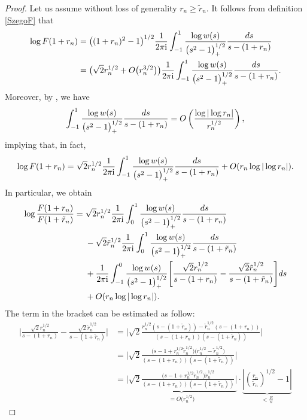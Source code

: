 \documentclass[11pt]{article}
\numberwithin{equation}{section}
\newcommand{\I}{\mathrm{i}}
\numberwithin{equation}{section}
\begin{document}
\begin{proof}
Let us assume without loss of generality $r_n \geq \tilde r_n$. It follows from definition \eqref{SzegoF} that
\begin{align*}
 \log F(1+r_n) &= \big((1+r_n)^2-1\big)^{1/2} \frac{1}{2\pi \I}\int_{-1}^1 \frac{\log w(s)}{\big(s^2-1\big)_+^{1/2}} \frac{{\rm d}s}{s-(1+r_n)}
 \\
 &=\big(\sqrt{2} r_n^{1/2}+O\big(r_n^{3/2}\big)\big) \frac{1}{2\pi \I}\int_{-1}^1 \frac{\log w(s)}{\big(s^2-1\big)_+^{1/2}} \frac{{\rm d}s}{s-(1+r_n)}.
\end{align*}
Moreover, by \cite[equation~A.11]{CD}, we have
\begin{align*}
 \int_{-1}^1 \frac{\log w(s)}{\big(s^2-1\big)_+^{1/2}} \frac{{\rm d}s}{s-(1+r_n)} = O\left(\frac{\log |\log r_n|}{r_n^{1/2}}\right),
\end{align*}
implying that, in fact,
\begin{align*}
 \log F(1+r_n) = \sqrt{2} r_n^{1/2} \frac{1}{2\pi \I}\int_{-1}^1 \frac{\log w(s)}{\big(s^2-1\big)_+^{1/2}} \frac{{\rm d}s}{s-(1+r_n)}+O(r_n \log |\log r_n|).
\end{align*}
In particular, we obtain
\begin{align} \nonumber
 \log \frac{F(1+r_n)}{F(1+\tilde r_n)}={}&
 \sqrt{2} r_n^{1/2} \frac{1}{2\pi \I}\int_{0}^1 \frac{\log w(s)}{\big(s^2-1\big)_+^{1/2}} \frac{{\rm d}s}{s-(1+r_n)}\\
 &-\sqrt{2} \tilde r_n^{1/2} \frac{1}{2\pi \I}\int_{0}^1 \frac{\log w(s)}{\big(s^2-1\big)_+^{1/2}} \frac{{\rm d}s}{s-(1+\tilde r_n)} \nonumber
 \\
 &+\frac{1}{2\pi \I}\int_{-1}^0 \frac{\log w(s)}{\big(s^2-1\big)_+^{1/2}} \Bigg[\frac{\sqrt{2} r_n^{1/2}}{s-(1+r_n)}-\frac{\sqrt{2} \tilde r_n^{1/2}}{s-(1+\tilde r_n)}\Bigg] {\rm d}s \nonumber \\
 &+O(r_n \log |\log r_n|).\label{FF1}
\end{align}
The term in the bracket can be estimated as follow:
\begin{align*}
 \Bigg|\frac{\sqrt{2} r_n^{1/2}}{s-(1+r_n)}-\frac{\sqrt{2} \tilde r_n^{1/2}}{s-(1+\tilde r_n)}\Bigg| &= \Bigg|\sqrt{2} \frac{r_n^{1/2}(s-(1+\tilde r_n))-\tilde r_n^{1/2}(s-(1+ r_n))}{(s-(1+r_n))(s-(1+\tilde r_n))}\Bigg|
 \\
 &= \Bigg|\sqrt{2} \frac{\big(s-1+r_n^{1/2}\tilde r_n^{1/2}\big)\big(r_n^{1/2}-\tilde r_n^{1/2}\big)}{(s-(1+r_n))(s-(1+\tilde r_n))}\Bigg|
 \\
 &= \underbrace{\Bigg|\sqrt{2} \frac{\big(s-1+r_n^{1/2}\tilde r_n^{1/2}\big) \tilde r_n^{1/2}}{(s-(1+r_n))(s-(1+\tilde r_n))}\Bigg|}_{= O\big(r_n^{1/2}\big)} \cdot \underbrace{\left|\left(\frac{r_n}{\tilde r_n}\right)^{1/2} -1 \right|}_{< \frac{R}{n}}

\end{align*}
\end{proof}
\end{document}
